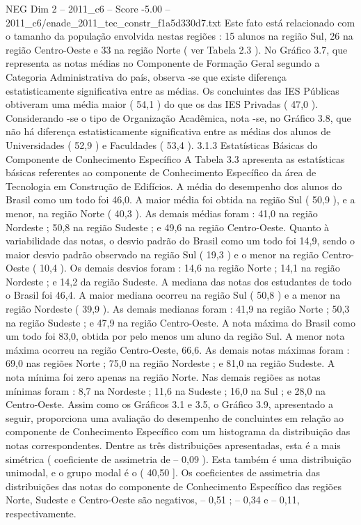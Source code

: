 \begin{textsample}{NEG Dim 2 – 2011\_c6 – Score -5.00 – 2011\_c6/enade\_2011\_tec\_constr\_f1a5d330d7.txt}
Este fato está relacionado com o tamanho da população envolvida nestas regiões : 15 alunos na região Sul, 26 na região Centro-Oeste e 33 na região Norte ( ver Tabela 2.3 ).
No Gráfico 3.7, que representa as notas médias no Componente de Formação Geral segundo a Categoria Administrativa do país, observa -se que existe diferença estatisticamente significativa entre as médias.
Os concluintes das IES Públicas obtiveram uma média maior ( 54,1 ) do que os das IES Privadas ( 47,0 ).
Considerando -se o tipo de Organização Acadêmica, nota -se, no Gráfico 3.8, que não há diferença estatisticamente significativa entre as médias dos alunos de Universidades ( 52,9 ) e Faculdades ( 53,4 ). 3.1.3 Estatísticas Básicas do Componente de Conhecimento Específico A Tabela 3.3 apresenta as estatísticas básicas referentes ao componente de Conhecimento Específico da área de Tecnologia em Construção de Edifícios.
A média do desempenho dos alunos do Brasil como um todo foi 46,0.
A maior média foi obtida na região Sul ( 50,9 ), e a menor, na região Norte ( 40,3 ).
As demais médias foram : 41,0 na região Nordeste ; 50,8 na região Sudeste ; e 49,6 na região Centro-Oeste.
Quanto à variabilidade das notas, o desvio padrão do Brasil como um todo foi 14,9, sendo o maior desvio padrão observado na região Sul ( 19,3 ) e o menor na região Centro-Oeste ( 10,4 ).
Os demais desvios foram : 14,6 na região Norte ; 14,1 na região Nordeste ; e 14,2 da região Sudeste.
A mediana das notas dos estudantes de todo o Brasil foi 46,4.
A maior mediana ocorreu na região Sul ( 50,8 ) e a menor na região Nordeste ( 39,9 ).
As demais medianas foram : 41,9 na região Norte ; 50,3 na região Sudeste ; e 47,9 na região Centro-Oeste.
A nota máxima do Brasil como um todo foi 83,0, obtida por pelo menos um aluno da região Sul.
A menor nota máxima ocorreu na região Centro-Oeste, 66,6.
As demais notas máximas foram : 69,0 nas regiões Norte ; 75,0 na região Nordeste ; e 81,0 na região Sudeste.
A nota mínima foi zero apenas na região Norte.
Nas demais regiões as notas mínimas foram : 8,7 na Nordeste ; 11,6 na Sudeste ; 16,0 na Sul ; e 28,0 na Centro-Oeste.
Assim como os Gráficos 3.1 e 3.5, o Gráfico 3.9, apresentado a seguir, proporciona uma avaliação do desempenho de concluintes em relação ao componente de Conhecimento Específico com um histograma da distribuição das notas correspondentes.
Dentre as três distribuições apresentadas, esta é a mais simétrica ( coeficiente de assimetria de – 0,09 ).
Esta também é uma distribuição unimodal, e o grupo modal é o ( 40,50 ].
Os coeficientes de assimetria das distribuições das notas do componente de Conhecimento Específico das regiões Norte, Sudeste e Centro-Oeste são negativos, – 0,51 ; – 0,34 e – 0,11, respectivamente.

\end{textsample}

